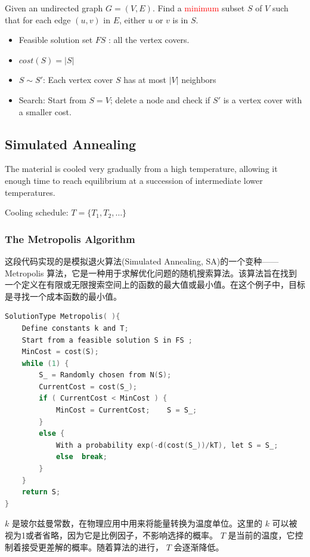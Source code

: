 \documentclass{article}
\begin{document}
Given an undirected graph $G = (V, E)$. Find a \textcolor{red}{minimum} subset $S$ of $V$ such that for each edge $(u, v)$ in $E$, either $u$ or $v$  is in $S$.

\begin{itemize}
    \item Feasible solution set $FS$ : all the vertex covers. 
    \item $cost(S)=|S|$
    \item $S\sim S'$: Each vertex cover $S$ has at most $|V|$ neighbors
    \item Search: Start from $S = V$; delete a node and check if $S'$ is a vertex cover with a smaller cost.
\end{itemize}

\subsection{Simulated Annealing}
The material is cooled very gradually from a high temperature, allowing it enough time to reach equilibrium at a succession of intermediate lower temperatures.

Cooling schedule:  $T = \{ T_1 , T_2 , \dots \}$

\subsubsection{The Metropolis Algorithm}

这段代码实现的是模拟退火算法(Simulated Annealing, SA)的一个变种——Metropolis 算法，它是一种用于求解优化问题的随机搜索算法。该算法旨在找到一个定义在有限或无限搜索空间上的函数的最大值或最小值。在这个例子中，目标是寻找一个成本函数的最小值。

\begin{lstlisting}[language={c}]
SolutionType Metropolis( ){
    Define constants k and T;
    Start from a feasible solution S in FS ;
    MinCost = cost(S);
    while (1) {
        S_ = Randomly chosen from N(S); 
        CurrentCost = cost(S_);
        if ( CurrentCost < MinCost ) {
            MinCost = CurrentCost;    S = S_;
        }
        else {
            With a probability exp(-d(cost(S_))/kT), let S = S_;
            else  break;
        }
    }
    return S;
}
\end{lstlisting}

$k$ 是玻尔兹曼常数，在物理应用中用来将能量转换为温度单位。这里的 $k$ 可以被视为1或者省略，因为它是比例因子，不影响选择的概率。 $T$ 是当前的温度，它控制着接受更差解的概率。随着算法的进行， $T$ 会逐渐降低。
\end{document}
